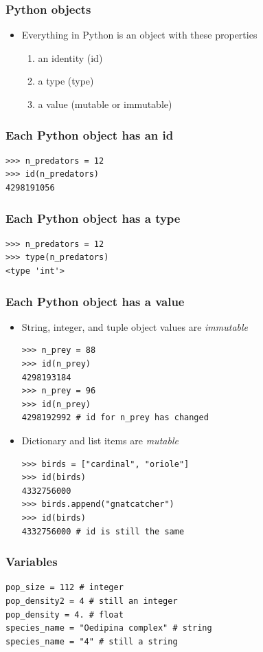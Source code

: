 \documentclass{beamer}
\begin{document}
\begin{frame}[fragile]
\frametitle{Python objects}
\begin{itemize}
\item Everything in Python is an object with these properties
\begin{enumerate}  
  \item an identity (id) 
  \item a type (type)
  \item a value (mutable or immutable)
\end{enumerate}
\end{itemize} 
\end{frame}

\begin{frame}[fragile]
\frametitle{Each Python object has an id}
\begin{lstlisting}
>>> n_predators = 12
>>> id(n_predators)
4298191056
\end{lstlisting} 
\end{frame}

\begin{frame}[fragile]
\frametitle{Each Python object has a type}
\begin{lstlisting}
>>> n_predators = 12
>>> type(n_predators)
<type 'int'>
\end{lstlisting}
\end{frame}

\begin{frame}[fragile]
\frametitle{Each Python object has a value}
\begin{itemize}
\item String, integer, and tuple object values are \emph{immutable}
\begin{lstlisting}
>>> n_prey = 88
>>> id(n_prey)
4298193184
>>> n_prey = 96
>>> id(n_prey)
4298192992 # id for n_prey has changed
\end{lstlisting}
\item Dictionary and list items are \emph{mutable}
\begin{lstlisting}
>>> birds = ["cardinal", "oriole"]
>>> id(birds)
4332756000
>>> birds.append("gnatcatcher")
>>> id(birds)
4332756000 # id is still the same
\end{lstlisting}
\end{itemize}
\end{frame}

\begin{frame}[fragile]
\frametitle{Variables}
\begin{lstlisting}
pop_size = 112 # integer
pop_density2 = 4 # still an integer
pop_density = 4. # float
species_name = "Oedipina complex" # string
species_name = "4" # still a string
\end{lstlisting}
\end{frame}
\end{document}
